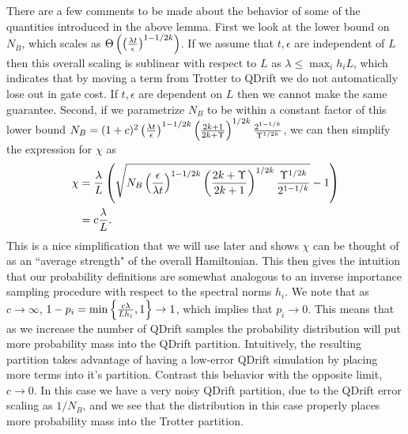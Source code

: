 There are a few comments to be made about the behavior of some of the quantities introduced in the above lemma. First we look at the lower bound on 
$N_B$, which scales as $\Theta\left( \left( \frac{\lambda t}{\epsilon} \right)^{1 - 1/2k} \right)$. If we assume that $t, \epsilon$ are independent of $L$ then this overall scaling is sublinear with respect to $L$ as $\lambda \leq \max_i h_i L$, which indicates that by moving a term from Trotter to QDrift we do not automatically lose out in gate cost. If $t, \epsilon$ are dependent on $L$ then we cannot make the same guarantee. Second, if we parametrize $N_B$ to be within a constant factor of this lower bound $N_B = ( 1 + c)^2 \left( \frac{\lambda t}{\epsilon} \right)^{1 - 1/2k} \left( \frac{2k + 1}{2k + \Upsilon} \right)^{1/2k} \frac{2^{1 - 1/k}}{\Upsilon^{1/2k}}$, we can then simplify the expression for $\chi$ as 
\begin{align}
    \chi &= \frac{\lambda }{L} \left( \sqrt{N_B \left( \frac{\epsilon}{\lambda t} \right)^{1 - 1/2k} \left( \frac{2k + \Upsilon}{2k+1} \right)^{1/2k} \frac{\Upsilon^{1/2k}}{2^{1-1/k}}  } - 1 \right) \\
    &= c \frac{\lambda}{L}.
\end{align}
This is a nice simplification that we will use later and shows $\chi$ can be thought of as an ``average strength" of the overall Hamiltonian. This then gives the intuition that our probability definitions are somewhat analogous to an inverse importance sampling procedure with respect to the spectral norms $h_i$. We note that as $c \to \infty$, $1-p_i = \min \left\{ \frac{c \lambda}{L h_i} , 1 \right\} \to 1$, which implies that $p_i \to 0$. This means that as we increase the number of QDrift samples the probability distribution will put more probability mass into the QDrift partition. Intuitively, the resulting partition takes advantage of having a low-error QDrift simulation by placing more terms into it's partition. Contrast this behavior with the opposite limit, $c \to 0$. In this case we have a very noisy QDrift partition, due to the QDrift error scaling as $1/N_B$, and we see that the distribution in this case properly places more probability mass into the Trotter partition.


